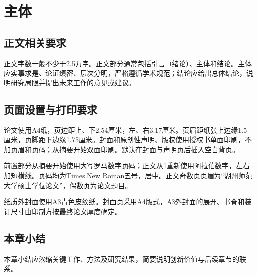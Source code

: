 \chapter{主体}
\section{正文相关要求}
正文字数一般不少于2.5万字。正文部分通常包括引言（绪论）、主体和结论。主体应实事求是、论证缜密、层次分明，严格遵循学术规范；结论应给出总体结论，说明研究局限并提出未来工作的意见或建议。
\section{页面设置与打印要求}
论文使用A4纸，页边距上、下2.54厘米，左、右3.17厘米。页眉距纸张上边缘1.5厘米，页脚距下边缘1.75厘米。封面和原创性声明、版权使用授权书单面印刷，不加页眉和页码；从摘要开始双面印刷。默认在封面与声明页后插入空白背页。

前置部分从摘要开始使用大写罗马数字页码；正文从1重新使用阿拉伯数字，左右加短横线。页码均为Times New Roman五号，居中。正文奇数页页眉为“湖州师范大学硕士学位论文”，偶数页为论文题目。

纸质外封面使用A3青色皮纹纸。封面页采用A4版式，A3外封面的展开、书脊和装订尺寸由印制方按最终论文厚度确定。
\section{本章小结}
本章小结应浓缩关键工作、方法及研究结果，简要说明创新价值与后续章节的联系。
